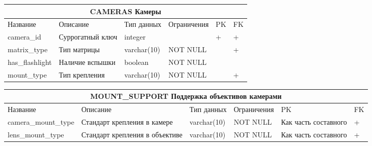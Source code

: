 \documentclass{article}
\begin{document}
\begin{tabular}{ |p{4cm}|p{4cm}|p{2.5cm}|p{3.5cm}|p{2cm}|p{1cm}| }
\hline
\multicolumn{6}{|c|}{CAMERAS Камеры} \\
\hline
Название & Описание & Тип данных & Ограничения & PK & FK\\
\hline
camera\_id                          &   %
Суррогатный ключ                    &   %
integer                             &   %
                                    &   %
 +                                  &   %
 +                                  \\  %
\hline
matrix\_type                        &   %
Тип матрицы                         &   %
varchar(10)                         &   %
NOT NULL                            &   %
                                    &   %
 +                                  \\  %
\hline
has\_flashlight                     &   %
Наличие вспышки                     &   %
boolean                             &   %
NOT NULL                            &   %
                                    &   %
                                    \\  %
\hline
mount\_type                         &   %
Тип крепления                       &   %
varchar(10)                         &   %
NOT NULL                            &   %
                                    &   %
 +                                  \\  %
\hline
\end{tabular}

\begin{tabular}{ |p{4cm}|p{4cm}|p{2.5cm}|p{3.5cm}|p{2cm}|p{1cm}| }
\hline
\multicolumn{6}{|c|}{MOUNT\_SUPPORT Поддержка объективов камерами} \\
\hline
Название & Описание & Тип данных & Ограничения & PK & FK\\
\hline
camera\_mount\_type                 &   %
Стандарт крепления в камере         &   %
varchar(10)                         &   %
NOT NULL                            &   %
Как часть составного                &   %
 +                                  \\  %
\hline
lens\_mount\_type                   &   %
Стандарт крепления в объективе      &   %
varchar(10)                         &   %
NOT NULL                            &   %
Как часть составного                &   %
 +                                  \\  %
\hline
\end{tabular}
\end{document}
